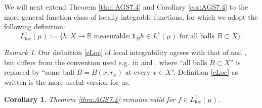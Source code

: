 \documentclass[11pt]{amsart}
\newtheorem{corollary}[theorem]{Corollary}
\theoremstyle{definition}
\theoremstyle{remark}
\newtheorem{remark}[theorem]{Remark}
\numberwithin{equation}{section}
\begin{document}
We will next extend Theorem \ref{thm:AGS7.4} and Corollary \ref{cor:AGS7.4}
to the more general function class of locally integrable functions,
for which we adopt the following definition:
\begin{equation}\label{eLoc}
  L^1_{\mathrm{loc}}(\mu):=\Big\{h:X\to\mathbb R\text{ measurable}: \mathbf{1}_B h\in
  L^1(\mu)\text{ for all balls }B\subset X\Big\}.
\end{equation}

\begin{remark}
Our definition \eqref{eLoc} of local integrability agrees with that of
\cite[p.~1905]{FHK:99} and \cite[p.~6]{HK:00}, but differs from the convention used e.g.\ in
\cite[p.~5]{Heinonen:book} and \cite[p.~46]{HKST:book}, where  ``all balls $B\subset X$'' is
replaced by ``some ball $B=B(x,r_x)$ at every $x\in X$''. Definition \eqref{eLoc} as
written is the more useful version for us.
\end{remark}


\begin{corollary}\label{cor:AGS7.4loc}
Theorem \ref{thm:AGS7.4} remains valid for $f\in L^1_{\mathrm{loc}}(\mu)$.
\end{corollary}
\end{document}
